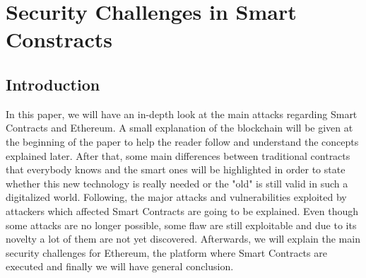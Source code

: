 \chapter{Security Challenges in Smart Constracts}


\newpage

\minitoc %

\newpage


\section{Introduction}
In this paper, we will have an in-depth look at the main attacks regarding Smart Contracts and Ethereum.
A small explanation of the blockchain will be given at the beginning of the paper  to help the reader follow and understand the concepts explained later.
After that, some main differences between traditional contracts that everybody knows and the smart ones will be highlighted in order to state whether this new technology is really needed or the "old" is still valid in such a digitalized world.
Following, the major attacks and vulnerabilities exploited by attackers which affected Smart Contracts are going to be explained. Even though some attacks are no longer possible, some flaw are still exploitable and due to its novelty a lot of them are not yet discovered. 
Afterwards, we will explain the main security challenges for Ethereum, the platform where Smart Contracts are executed and finally we will have general conclusion.

